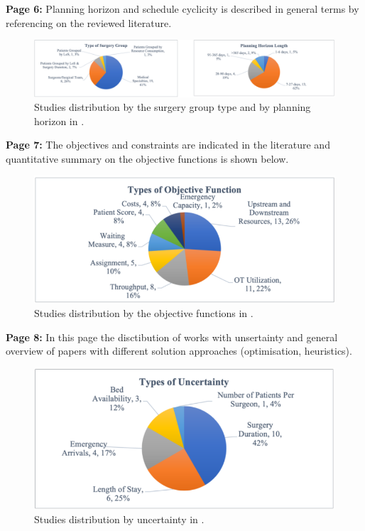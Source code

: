     \textbf{Page 6:}
    Planning horizon and schedule cyclicity is described in general terms by referencing on the reviewed literature.
    \begin{figure}[H]
        \centering
        \includegraphics[width=.8\textwidth]{figures/0007_SR01MY19/fig3.png}
        \caption{Studies distribution by the surgery group type and by planning horizon in \cite{x236}.}
        \label{fig3:0007_SR01MY19}
    \end{figure}

    \textbf{Page 7:}
    The objectives and constraints are indicated in the literature and quantitative summary on the objective functions is shown below.
    \begin{figure}[H]
        \centering
        \includegraphics[width=.8\textwidth]{figures/0007_SR01MY19/fig4.png}
        \caption{Studies distribution by the objective functions in \cite{x236}.}
        \label{fig4:0007_SR01MY19}
    \end{figure}

    \textbf{Page 8:}
    In this page the disctibution of works with unsertainty and general overview of papers with different solution approaches (optimisation, heuristics).
    \begin{figure}[H]
        \centering
        \includegraphics[width=.8\textwidth]{figures/0007_SR01MY19/fig5.png}
        \caption{Studies distribution by uncertainty in \cite{x236}.}
        \label{fig5:0007_SR01MY19}
    \end{figure}

